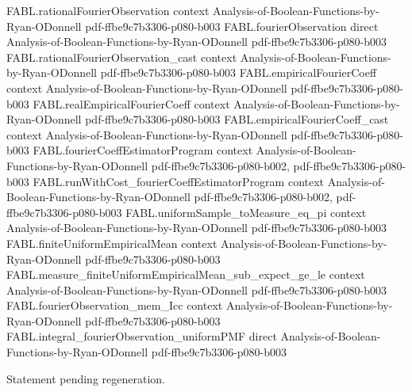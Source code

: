 \begin{theorem}
\proofstep
  {FABL.rationalFourierObservation}
  {context}
  {Analysis-of-Boolean-Functions-by-Ryan-ODonnell}
  {pdf-ffbe9c7b3306-p080-b003}
\proofstep
  {FABL.fourierObservation}
  {direct}
  {Analysis-of-Boolean-Functions-by-Ryan-ODonnell}
  {pdf-ffbe9c7b3306-p080-b003}
\proofstep
  {FABL.rationalFourierObservation_cast}
  {context}
  {Analysis-of-Boolean-Functions-by-Ryan-ODonnell}
  {pdf-ffbe9c7b3306-p080-b003}
\proofstep
  {FABL.empiricalFourierCoeff}
  {context}
  {Analysis-of-Boolean-Functions-by-Ryan-ODonnell}
  {pdf-ffbe9c7b3306-p080-b003}
\proofstep
  {FABL.realEmpiricalFourierCoeff}
  {context}
  {Analysis-of-Boolean-Functions-by-Ryan-ODonnell}
  {pdf-ffbe9c7b3306-p080-b003}
\proofstep
  {FABL.empiricalFourierCoeff_cast}
  {context}
  {Analysis-of-Boolean-Functions-by-Ryan-ODonnell}
  {pdf-ffbe9c7b3306-p080-b003}
\proofstep
  {FABL.fourierCoeffEstimatorProgram}
  {context}
  {Analysis-of-Boolean-Functions-by-Ryan-ODonnell}
  {pdf-ffbe9c7b3306-p080-b002,
    pdf-ffbe9c7b3306-p080-b003}
\proofstep
  {FABL.runWithCost_fourierCoeffEstimatorProgram}
  {context}
  {Analysis-of-Boolean-Functions-by-Ryan-ODonnell}
  {pdf-ffbe9c7b3306-p080-b002,
    pdf-ffbe9c7b3306-p080-b003}
\proofstep
  {FABL.uniformSample_toMeasure_eq_pi}
  {context}
  {Analysis-of-Boolean-Functions-by-Ryan-ODonnell}
  {pdf-ffbe9c7b3306-p080-b003}
\proofstep
  {FABL.finiteUniformEmpiricalMean}
  {context}
  {Analysis-of-Boolean-Functions-by-Ryan-ODonnell}
  {pdf-ffbe9c7b3306-p080-b003}
\proofstep
  {FABL.measure_finiteUniformEmpiricalMean_sub_expect_ge_le}
  {context}
  {Analysis-of-Boolean-Functions-by-Ryan-ODonnell}
  {pdf-ffbe9c7b3306-p080-b003}
\proofstep
  {FABL.fourierObservation_mem_Icc}
  {context}
  {Analysis-of-Boolean-Functions-by-Ryan-ODonnell}
  {pdf-ffbe9c7b3306-p080-b003}
\proofstep
  {FABL.integral_fourierObservation_uniformPMF}
  {direct}
  {Analysis-of-Boolean-Functions-by-Ryan-ODonnell}
  {pdf-ffbe9c7b3306-p080-b003}

Statement pending regeneration.
\end{theorem}

